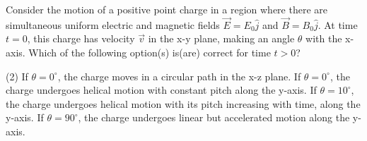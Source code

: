 
\item Consider the motion of a positive point charge in a region where there are simultaneous uniform electric and magnetic fields $\vec{E} = E_0 \hat{j}$ and $\vec{B} = B_0 \hat{j}$. At time $t = 0$, this charge has velocity $\vec{v}$ in the x-y plane, making an angle $\theta$ with the x-axis. Which of the following option(s) is(are) correct for time $t > 0$?
    \begin{tasks}(2)
        \task If $\theta = 0^\circ$, the charge moves in a circular path in the x-z plane.
        \task If $\theta = 0^\circ$, the charge undergoes helical motion with constant pitch along the y-axis.
        \task If $\theta = 10^\circ$, the charge undergoes helical motion with its pitch increasing with time, along the y-axis.
        \task If $\theta = 90^\circ$, the charge undergoes linear but accelerated motion along the y-axis.
    \end{tasks}
